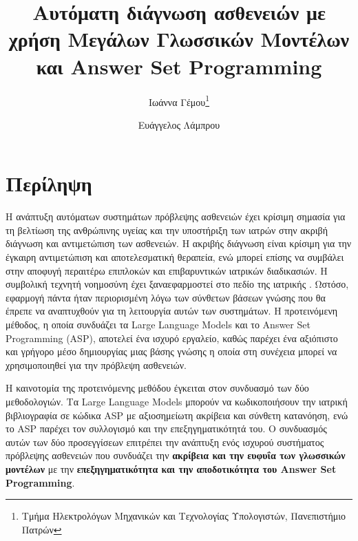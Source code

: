 \documentclass[12pt]{extarticle}
\title{Αυτόματη διάγνωση ασθενειών με χρήση Μεγάλων Γλωσσικών Μοντέλων και Answer Set Programming}
\author{Ιωάννα Γέμου\thanks{Τμήμα Ηλεκτρολόγων Μηχανικών και Τεχνολογίας Υπολογιστών, Πανεπιστήμιο Πατρών} \\ \src{ioannagemou@upnet.gr} \and Ευάγγελος Λάμπρου\footnotemark[1] \\ \src{e.lamprou@upnet.gr}}
\begin{document}
\maketitle
\tableofcontents
\newpage
\section{Περίληψη}
Η ανάπτυξη αυτόματων συστημάτων πρόβλεψης ασθενειών έχει κρίσιμη σημασία για τη βελτίωση της ανθρώπινης υγείας και την υποστήριξη των ιατρών στην ακριβή διάγνωση και αντιμετώπιση των ασθενειών. Η ακριβής διάγνωση είναι κρίσιμη για την έγκαιρη αντιμετώπιση και αποτελεσματική θεραπεία, ενώ μπορεί επίσης να συμβάλει στην αποφυγή περαιτέρω επιπλοκών και επιβαρυντικών ιατρικών διαδικασιών. 
Η συμβολική τεχνητή νοημοσύνη έχει ξαναεφαρμοστεί στο πεδίο της ιατρικής \cite{Alviano_2020}. Ωστόσο,
εφαρμογή πάντα ήταν περιορισμένη λόγω των σύνθετων βάσεων γνώσης που θα έπρεπε να αναπτυχθούν για τη λειτουργία 
αυτών των συστημάτων.
Η προτεινόμενη μέθοδος, η οποία συνδυάζει τα Large Language Models και το Answer Set Programming (ASP), αποτελεί ένα ισχυρό εργαλείο, καθώς παρέχει ένα αξιόπιστο και γρήγορο μέσο δημιουργίας μιας βάσης γνώσης η οποία 
στη συνέχεια μπορεί να χρησιμοποιηθεί για την πρόβλεψη ασθενειών.



Η καινοτομία της προτεινόμενης μεθόδου έγκειται στον συνδυασμό των δύο μεθοδολογιών. Τα Large Language Models μπορούν να κωδικοποιήσουν την ιατρική βιβλιογραφία 
σε κώδικα ASP με αξιοσημείωτη ακρίβεια και σύνθετη κατανόηση, ενώ το ASP παρέχει τον συλλογισμό και την επεξηγηματικότητά του. Ο συνδυασμός αυτών των δύο προσεγγίσεων επιτρέπει την ανάπτυξη ενός ισχυρού συστήματος πρόβλεψης ασθενειών που συνδυάζει την \textbf{ακρίβεια και την ευφυΐα των γλωσσικών μοντέλων} με την \textbf{επεξηγηματικότητα και την αποδοτικότητα του Answer Set Programming}.
\end{document}
